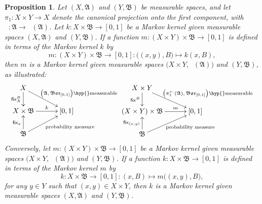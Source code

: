 \documentclass[
twoside=true,
paper=letter,
fontsize=9pt,
pagesize=auto,
leqno,
openany,
headsepline,
overfullrule,
]{scrbook}
\theoremstyle{plain}
\theoremstyle{plain}
\newtheorem{prop}[thm]{Proposition}
\theoremstyle{definition}
\theoremstyle{bfnoteitalic}
\theoremstyle{bfnoteroman}
\newcommand{\sigalg}[1]{\mathfrak{#1}}
\newcommand{\sfop}[1]{\mathsf{#1}}
\newcommand{\borel}{\mathfrak{Bor}}
\newcommand{\preimage}[1]{\mathop{#1^{\leftarrow}}}
\newcommand{\sigmaalgebra}{\sigalg{A}}
\newcommand{\sigmaalgebraii}{\sigalg{B}}
\newcommand{\measurespace}{X}
\newcommand{\measurespaceii}{Y}
\newcommand{\mspaceelt}{x}
\newcommand{\mspaceeltii}{y}
\newcommand{\setii}{B}
\newcommand{\projectionone}{\pi_1}
\newcommand{\markovkernel}{k}
\newcommand{\markovkernelii}{m}
\newcommand{\fixinthefirst}[1]{\sfop{fix}_{#1}}
\newcommand{\fixinthesecond}[1]{\sfop{fix}^{#1}}
\begin{document}
\begin{prop}\label{induced_markov_kernel}
Let $(\measurespace, \sigmaalgebra)$ and 
$(\measurespaceii, \sigmaalgebraii)$ be measurable spaces, 
and let 
$\projectionone: \measurespace\times\measurespaceii \to \measurespace$ denote the canonical projection onto the first component, with 
$\preimage\projectionone: 
\sigmaalgebra\to
\preimage{\projectionone}(\sigmaalgebra)$.
Let
$\markovkernel:\measurespace\times\sigmaalgebraii\to [0,1]$ 
be a Markov kernel given measurable spaces
$(\measurespace, \sigmaalgebra)$ and 
$(\measurespaceii, \sigmaalgebraii)$. If a function 
$\markovkernelii:
(\measurespace\times\measurespaceii) \times \sigmaalgebraii 
\to
[0,1]$
is defined in terms of the Markov kernel $\markovkernel$ by
\[
\markovkernelii:
(\measurespace\times\measurespaceii) \times \sigmaalgebraii 
\to
[0,1]
: 
\bigl((\mspaceelt,\mspaceeltii),\setii\bigr)\mapsto 
\markovkernel(\mspaceelt,\setii),
\]
then 
$\markovkernelii$ is a Markov kernel given measurable spaces
$\bigl(\measurespace\times\measurespaceii, \preimage\projectionone(\sigmaalgebra)\bigr)$
and
$(\measurespaceii, \sigmaalgebraii)$, as illustrated:
\[
\xymatrix@R=18pt@C=30pt{ 
\measurespace \ar[d]_-{\fixinthesecond{\setii}_\measurespace} 
\ar[dr]^{\qquad\text{ $\bigl(\sigmaalgebra, \borel_{[0,1]}\bigr)$\hyp{}measurable}}\\
\measurespace\times\sigmaalgebraii \ar[r]^-{\markovkernel} & [0,1] \\
\sigmaalgebraii 
\ar[ur]_{\qquad\text{probability measure}} \ar[u]^{\fixinthefirst{\mspaceelt}} & \\
}
%
\xymatrix@R=18pt@C=30pt{ 
\measurespace\times\measurespaceii 
\ar[d]_-{\fixinthesecond{\setii}}
\ar[dr]^{\qquad\text{\qquad$\bigl(\preimage\projectionone(\sigmaalgebra), \borel_{[0,1]}\bigr)$\hyp{}measurable}}\\
(\measurespace\times\measurespaceii)\times\sigmaalgebraii \ar[r]^-{\markovkernelii} & [0,1] \\
\sigmaalgebraii 
\ar[ur]_{\qquad\text{probability measure}} \ar[u]^{\fixinthefirst{(\mspaceelt,\mspaceeltii)}} & \\
}
\]
Conversely, let 
$\markovkernelii :(\measurespace\times\measurespaceii)
\times \sigmaalgebraii
\to [0,1]$ be a Markov kernel given measurable spaces
$\bigl(\measurespace\times\measurespaceii, \preimage\projectionone(\sigmaalgebra)\bigr)$
and
$(\measurespaceii, \sigmaalgebraii)$.
If a function 
$\markovkernel:
\measurespace\times \sigmaalgebraii 
\to
[0,1]$
is defined in terms of the Markov kernel $\markovkernelii$ by
\[
\markovkernel:
\measurespace\times \sigmaalgebraii 
\to
[0,1]
: 
(\mspaceelt,\setii)
\mapsto 
\markovkernelii\bigl((\mspaceelt,\mspaceeltii),\setii\bigr),
\]
for any $\mspaceeltii\in\measurespaceii$ such that
$(\mspaceelt, \mspaceeltii)\in\measurespace\times\measurespaceii$,
then $\markovkernel$
is a Markov kernel given measurable spaces
$(\measurespace, \sigmaalgebra)$ and 
$(\measurespaceii, \sigmaalgebraii)$.
\end{prop}
\end{document}

